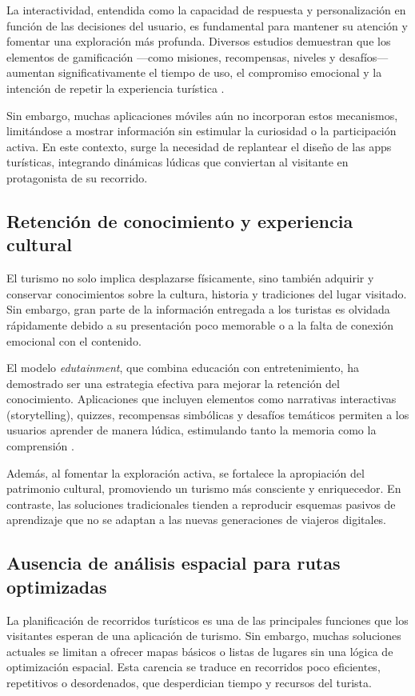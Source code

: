 \documentclass[12pt]{article}
\begin{document}
La interactividad, entendida como la capacidad de respuesta y personalización en función de las decisiones del usuario, es fundamental para mantener su atención y fomentar una exploración más profunda. Diversos estudios demuestran que los elementos de gamificación —como misiones, recompensas, niveles y desafíos— aumentan significativamente el tiempo de uso, el compromiso emocional y la intención de repetir la experiencia turística \cite{Weber2017,Swacha2017}. 

Sin embargo, muchas aplicaciones móviles aún no incorporan estos mecanismos, limitándose a mostrar información sin estimular la curiosidad o la participación activa. En este contexto, surge la necesidad de replantear el diseño de las apps turísticas, integrando dinámicas lúdicas que conviertan al visitante en protagonista de su recorrido.

\subsection{Retención de conocimiento y experiencia cultural}
El turismo no solo implica desplazarse físicamente, sino también adquirir y conservar conocimientos sobre la cultura, historia y tradiciones del lugar visitado. Sin embargo, gran parte de la información entregada a los turistas es olvidada rápidamente debido a su presentación poco memorable o a la falta de conexión emocional con el contenido.

El modelo \textit{edutainment}, que combina educación con entretenimiento, ha demostrado ser una estrategia efectiva para mejorar la retención del conocimiento. Aplicaciones que incluyen elementos como narrativas interactivas (storytelling), quizzes, recompensas simbólicas y desafíos temáticos permiten a los usuarios aprender de manera lúdica, estimulando tanto la memoria como la comprensión \cite{Frontiers2024,Architecture2019}. 

Además, al fomentar la exploración activa, se fortalece la apropiación del patrimonio cultural, promoviendo un turismo más consciente y enriquecedor. En contraste, las soluciones tradicionales tienden a reproducir esquemas pasivos de aprendizaje que no se adaptan a las nuevas generaciones de viajeros digitales.

\subsection{Ausencia de análisis espacial para rutas optimizadas}
La planificación de recorridos turísticos es una de las principales funciones que los visitantes esperan de una aplicación de turismo. Sin embargo, muchas soluciones actuales se limitan a ofrecer mapas básicos o listas de lugares sin una lógica de optimización espacial. Esta carencia se traduce en recorridos poco eficientes, repetitivos o desordenados, que desperdician tiempo y recursos del turista.
\end{document}
